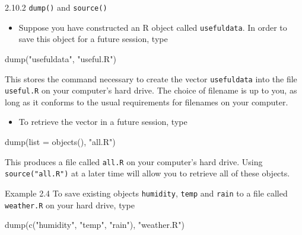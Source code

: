\documentclass[
  9pt,
  a4paper,
  ignorenonframetext,
  notheorems]{beamer}
\newenvironment{Shaded}{\begin{snugshade}}{\end{snugshade}}
\newcommand{\AttributeTok}[1]{\textcolor[rgb]{0.40,0.45,0.13}{#1}}
\newcommand{\FunctionTok}[1]{\textcolor[rgb]{0.28,0.35,0.67}{#1}}
\newcommand{\NormalTok}[1]{\textcolor[rgb]{0.00,0.23,0.31}{#1}}
\newcommand{\StringTok}[1]{\textcolor[rgb]{0.13,0.47,0.30}{#1}}
\providecommand{\tightlist}{%
  \setlength{\itemsep}{0pt}\setlength{\parskip}{0pt}}\usepackage{longtable,booktabs,array}
\begin{document}
\begin{frame}[fragile]
\begin{block}{2.10.2 \texttt{dump()} and \texttt{source()}}
\protect\hypertarget{dump-and-source}{}
\begin{itemize}
\tightlist
\item
  Suppose you have constructed an R object called \texttt{usefuldata}.
  In order to save this object for a future session, type
\end{itemize}

\begin{Shaded}
\begin{Highlighting}[]
\FunctionTok{dump}\NormalTok{(}\StringTok{"usefuldata"}\NormalTok{, }\StringTok{"useful.R"}\NormalTok{)}
\end{Highlighting}
\end{Shaded}

This stores the command necessary to create the vector
\texttt{usefuldata} into the file \texttt{useful.R} on your computer's
hard drive. The choice of filename is up to you, as long as it conforms
to the usual requirements for filenames on your computer.

\begin{itemize}
\tightlist
\item
  To retrieve the vector in a future session, type
\end{itemize}

\begin{Shaded}
\begin{Highlighting}[]
\FunctionTok{dump}\NormalTok{(}\AttributeTok{list =} \FunctionTok{objects}\NormalTok{(), }\StringTok{"all.R"}\NormalTok{)}
\end{Highlighting}
\end{Shaded}

This produces a file called \texttt{all.R} on your computer's hard
drive. Using \texttt{source("all.R")} at a later time will allow you to
retrieve all of these objects.
\end{block}

\begin{block}{Example 2.4}
\protect\hypertarget{example-2.4}{}
To save existing objects \texttt{humidity}, \texttt{temp} and
\texttt{rain} to a file called \texttt{weather.R} on your hard drive,
type

\begin{Shaded}
\begin{Highlighting}[]
\FunctionTok{dump}\NormalTok{(}\FunctionTok{c}\NormalTok{(}\StringTok{"humidity"}\NormalTok{, }\StringTok{"temp"}\NormalTok{, }\StringTok{"rain"}\NormalTok{), }\StringTok{"weather.R"}\NormalTok{)}
\end{Highlighting}
\end{Shaded}
\end{block}
\end{frame}
\end{document}
